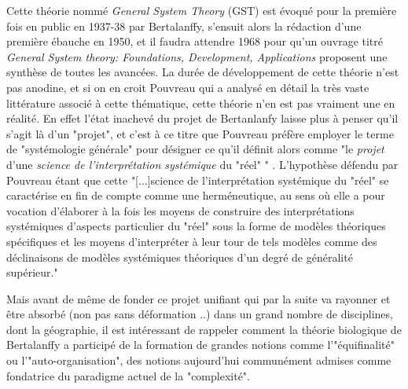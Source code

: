 {Cette théorie nommé \textit{General System Theory} (GST) est évoqué pour la première fois en public en 1937-38 par Bertalanffy, s'ensuit alors la rédaction d'une première ébauche en 1950, et il faudra attendre 1968 pour qu'un ouvrage titré \textit{General System theory: Foundations, Development, Applications} proposent une synthèse de toutes les avancées. La durée de développement de cette théorie n'est pas anodine, et si on en croit Pouvreau \autocite{Pouvreau2013} qui a analysé en détail la très vaste littérature associé à cette thématique, cette théorie n'en est pas vraiment une en réalité. En effet l'état inachevé du projet de Bertanlanfy laisse plus à penser qu'il s'agit là d'un "projet", et c'est à ce titre que Pouvreau préfère employer le terme de "systémologie générale" pour désigner ce qu'il définit alors comme "le \textit{projet} d'une \textit{science de l'interprétation systémique} du "réel" " \autocite[9]{Pouvreau2013}. L'hypothèse défendu par Pouvreau étant que cette "[...]science de l'interprétation systémique du "réel" se caractérise en fin de compte comme une herméneutique, au sens où elle a pour vocation d'élaborer à la fois les moyens de construire des interprétations systémiques d'aspects particulier du "réel" sous la forme de modèles théoriques spécifiques et les moyens d'interpréter à leur tour de tels modèles comme des déclinaisons de modèles systémiques théoriques d'un degré de généralité supérieur."\autocite[9-10]{Pouvreau2013}

Mais avant de même de fonder ce projet unifiant qui par la suite va rayonner et être absorbé (non pas sans déformation ..) dans un grand nombre de disciplines, dont la géographie, il est intéressant de rappeler comment la théorie biologique de Bertalanffy a participé de la formation de grandes notions comme l'"équifinalité" ou l'"auto-organisation", des notions aujourd'hui communément admises comme fondatrice du paradigme actuel de la "complexité".

}
